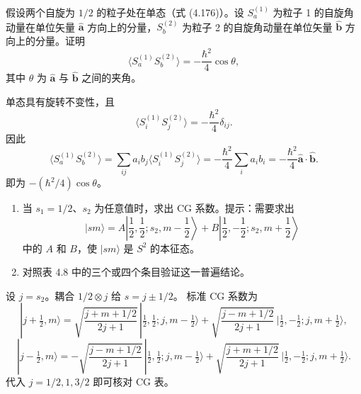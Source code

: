 \begin{question}
假设两个自旋为 $1/2$ 的粒子处在单态（式 (4.176)）。设 $S_a^{(1)}$ 为粒子 1 的自旋角动量在单位矢量 $\hat{\mathbf a}$ 方向上的分量，$S_b^{(2)}$ 为粒子 2 的自旋角动量在单位矢量 $\hat{\mathbf b}$ 方向上的分量。证明
\[
\bigl\langle S_a^{(1)}S_b^{(2)}\bigr\rangle=-\frac{\hbar^2}{4}\cos\theta,
\]
其中 $\theta$ 为 $\hat{\mathbf a}$ 与 $\hat{\mathbf b}$ 之间的夹角。

\par\smallskip
{}

\end{question}
\begin{solution}

单态具有旋转不变性，且
\[
\langle S_i^{(1)}S_j^{(2)}\rangle=-\frac{\hbar^2}{4}\delta_{ij}.
\]
因此
\[
\langle S_a^{(1)}S_b^{(2)}\rangle
=\sum_{ij}a_i b_j\langle S_i^{(1)}S_j^{(2)}\rangle
=-\frac{\hbar^2}{4}\sum_i a_i b_i
=-\frac{\hbar^2}{4}\hat{\mathbf a}\cdot\hat{\mathbf b}.
\]
即为 $-(\hbar^2/4)\cos\theta$。

\end{solution}

\begin{question}
\begin{enumerate}
\item 当 $s_1=1/2$、$s_2$ 为任意值时，求出 CG 系数。提示：需要求出
\[
|sm\rangle=A\left|\frac12,\frac12;s_2,m-\frac12\right\rangle+B\left|\frac12,-\frac12;s_2,m+\frac12\right\rangle
\]
中的 $A$ 和 $B$，使 $|sm\rangle$ 是 $S^2$ 的本征态。
\item 对照表 4.8 中的三个或四个条目验证这一普遍结论。
\end{enumerate}
\end{question}
\begin{solution}

设 $j=s_2$。耦合 $1/2\otimes j$ 给 $s=j\pm1/2$。
标准 CG 系数为
\[
|j+\tfrac12,m\rangle=
\sqrt{\frac{j+m+1/2}{2j+1}}\,|\tfrac12,\tfrac12;j,m-\tfrac12\rangle
+\sqrt{\frac{j-m+1/2}{2j+1}}\,|\tfrac12,-\tfrac12;j,m+\tfrac12\rangle,
\]
\[
|j-\tfrac12,m\rangle=
-\sqrt{\frac{j-m+1/2}{2j+1}}\,|\tfrac12,\tfrac12;j,m-\tfrac12\rangle
+\sqrt{\frac{j+m+1/2}{2j+1}}\,|\tfrac12,-\tfrac12;j,m+\tfrac12\rangle.
\]
代入 $j=1/2,1,3/2$ 即可核对 CG 表。

\end{solution}

